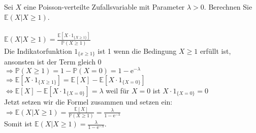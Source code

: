 \documentclass[a4paper]{article}
\begin{document}
\subsection{}
Sei $X$ eine Poisson-verteilte Zufallsvariable mit Parameter $\lambda>0$. Berechnen Sie $\mathbb{E} (X\vert X \geq 1)$.\\\\
$\mathbb{E}(X \vert X \geq 1) = \frac{\mathbb{E}[X \cdot 1_{\{X \geq 1\}}]}{\mathbb{P}(X \geq 1)}$\\
Die Indikatorfunktion $1_{\{x \geq 1\}}$ ist 1 wenn die Bedingung $X \geq 1$ erfüllt ist, ansonsten ist der Term gleich 0\\
$\Rightarrow \mathbb{P}(X \geq 1) = 1 - \mathbb{P}(X = 0) = 1 - \text{e}^{-\lambda}$\\
$\Rightarrow \mathbb{E}[X \cdot 1_{\{X \geq 1\}}] = \mathbb{E}[X] - \mathbb{E}[X \cdot 1_{\{X = 0\}}]$\\
$\Leftrightarrow \mathbb{E}[X] - \mathbb{E}[X \cdot 1_{\{X = 0\}}] = \lambda$ weil für $X = 0$ ist $X \cdot 1_{\{X = 0\}} = 0$\\
Jetzt setzen wir die Formel zusammen und setzen ein:\\
$\Rightarrow \mathbb{E}(X \vert X \geq 1) = \frac{\mathbb{E}[X]}{\mathbb{P}(X \geq 1)} = \frac{\lambda}{1 - \text{e}^{-\lambda}}$\\
Somit ist $\mathbb{E}(X \vert X \geq 1) = \frac{\lambda}{1 - \text{e}^{-\lambda}}$.
\clearpage
\end{document}
